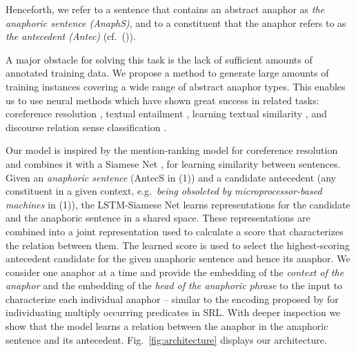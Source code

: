 \documentclass[11pt,letterpaper]{article}
\begin{document}
Henceforth, we refer to a sentence that contains an abstract anaphor as {\em the anaphoric sentence (AnaphS)}, and to a constituent that the anaphor refers to as {\em the antecedent (Antec)} (cf.\ ()).










A major obstacle for solving this task is the lack of sufficient amounts of 
annotated training data.
We propose a method to generate large amounts of training instances covering a wide range of abstract anaphor types. 
This 
enables us to use 
neural methods which have shown great success in related tasks:
coreference resolution \cite{clark2016deep}, textual entailment \cite{bowman-EtAl:2016:P16-1},
learning textual similarity \cite{mueller2016siamese}, and discourse relation sense classification \cite{rutherfordetal:17}. 

Our model is inspired by the mention-ranking model for coreference resolution \cite{wiseman2015learning, clark2015entity, clark2016deep, clark2016improving} and combines it with a Siamese Net \cite{mueller2016siamese}, \cite{ neculoiu-versteegh-rotaru:2016:RepL4NLP} for learning si\-mi\-la\-ri\-ty between sentences. 
Given an \textit{anaphoric sentence} (AntecS in (1)) 
and a candidate antecedent (any constituent in a given context, e.g.\ \textit{being obsoleted by microprocessor-based machines} in (1)), the LSTM-Siamese Net learns representations for the candidate and the anaphoric sentence in a shared space. 
These representations are combined into a joint representation used to calculate a score that characterizes the relation between them. 
The learned score is used to select the highest-scoring antecedent candidate for the given anaphoric sentence and hence its anaphor. 
We consider one anaphor at a time and provide the embedding of the {\em context of the anaphor} and the embedding of the {\em head of the anaphoric phrase} to the input to characterize each individual anaphor -- similar to the encoding proposed by \citet{zhou-xu:2015:ACL-IJCNLP} for individuating multiply occurring predicates in SRL. With deeper inspection we show that the model learns a relation between the anaphor in the anaphoric sentence and its antecedent. Fig.\ \ref{fig:architecture} displays our architecture.
\end{document}
